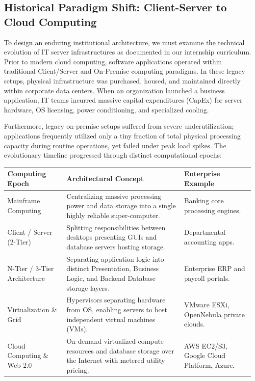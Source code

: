 \documentclass[10pt,journal,compsoc]{IEEEtran}
\begin{document}
\subsection{Historical Paradigm Shift: Client-Server to Cloud Computing}
To design an enduring institutional architecture, we must examine the technical evolution of IT server infrastructures as documented in our internship curriculum. Prior to modern cloud computing, software applications operated within traditional Client/Server and On-Premise computing paradigms. In these legacy setups, physical infrastructure was purchased, housed, and maintained directly within corporate data centers. When an organization launched a business application, IT teams incurred massive capital expenditures (CapEx) for server hardware, OS licensing, power conditioning, and specialized cooling.

Furthermore, legacy on-premise setups suffered from severe underutilization; applications frequently utilized only a tiny fraction of total physical processing capacity during routine operations, yet failed under peak load spikes. The evolutionary timeline progressed through distinct computational epochs:

\vspace{10pt}
\noindent
\begin{center}
\renewcommand{\arraystretch}{1.3}
\begin{tabular}{|L{3.5cm}|L{6.8cm}|L{4.5cm}|}
\hline
{}
\textbf{\color{white}Computing Epoch} & \textbf{\color{white}Architectural Concept} & \textbf{\color{white}Enterprise Example} \\
\hline
Mainframe Computing & Centralizing massive processing power and data storage into a single highly reliable super-computer. & Banking core processing engines. \\
\hline
{}
Client / Server (2-Tier) & Splitting responsibilities between desktops presenting GUIs and database servers hosting storage. & Departmental accounting apps. \\
\hline
N-Tier / 3-Tier Architecture & Separating application logic into distinct Presentation, Business Logic, and Backend Database storage layers. & Enterprise ERP and payroll portals. \\
\hline
{}
Virtualization \& Grid & Hypervisors separating hardware from OS, enabling servers to host independent virtual machines (VMs). & VMware ESXi, OpenNebula private clouds. \\
\hline
Cloud Computing \& Web 2.0 & On-demand virtualized compute resources and database storage over the Internet with metered utility pricing. & AWS EC2/S3, Google Cloud Platform, Azure. \\
\hline
\end{tabular}
\end{center}
\end{document}
